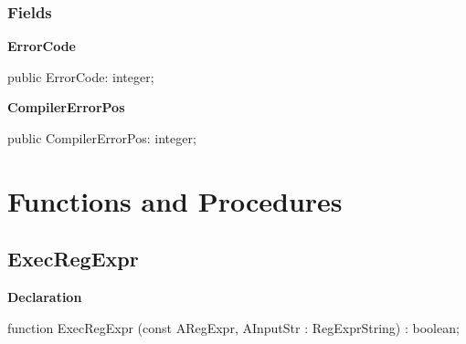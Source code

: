 \documentclass{report}
\newif\ifpdf
\begin{document}
\subsubsection*{\large{\textbf{Fields}}\normalsize\hspace{1ex}\hfill}
\begin{list}{}{
\setlength{\itemindent}{0cm}
\setlength{\listparindent}{0cm}
\setlength{\leftmargin}{\evensidemargin}
\addtolength{\leftmargin}{\tmplength}
\settowidth{\labelsep}{X}
\addtolength{\leftmargin}{\labelsep}
\setlength{\labelwidth}{\tmplength}
}
\label{RegExpr.ERegExpr-ErrorCode}
\item[\textbf{ErrorCode}\hfill]
\ifpdf
\begin{flushleft}
\fi
\begin{ttfamily}
public ErrorCode: integer;\end{ttfamily}

\ifpdf
\end{flushleft}
\fi


\par  \label{RegExpr.ERegExpr-CompilerErrorPos}
\item[\textbf{CompilerErrorPos}\hfill]
\ifpdf
\begin{flushleft}
\fi
\begin{ttfamily}
public CompilerErrorPos: integer;\end{ttfamily}

\ifpdf
\end{flushleft}
\fi


\par  \end{list}
\section{Functions and Procedures}
\ifpdf
\subsection*{\large{\textbf{ExecRegExpr}}\normalsize\hspace{1ex}\hrulefill}
\else
\subsection*{ExecRegExpr}
\fi
\label{RegExpr-ExecRegExpr}
\begin{list}{}{
\setlength{\itemindent}{0cm}
\setlength{\listparindent}{0cm}
\setlength{\leftmargin}{\evensidemargin}
\addtolength{\leftmargin}{\tmplength}
\settowidth{\labelsep}{X}
\addtolength{\leftmargin}{\labelsep}
\setlength{\labelwidth}{\tmplength}
}
\item[\textbf{Declaration}\hfill]
\ifpdf
\begin{flushleft}
\fi
\begin{ttfamily}
function ExecRegExpr (const ARegExpr, AInputStr : RegExprString) : boolean;\end{ttfamily}

\ifpdf
\end{flushleft}
\fi

\end{list}
\ifpdf
\end{document}
